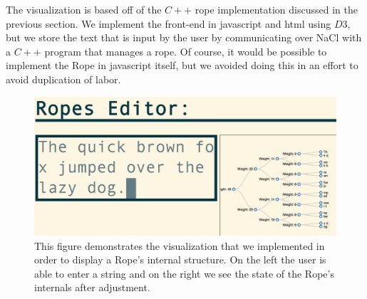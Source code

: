 \documentclass[12pt]{article}
\begin{document}
The visualization is based off of the $C++$ rope implementation discussed in the previous section. We implement the front-end in javascript and html using $D3$, but we store the text that is input by the user by communicating over NaCl with a $C++$ program that manages a rope. Of course, it would be possible to implement the Rope in javascript itself, but we avoided doing this in an effort to avoid duplication of labor.

\begin{figure}[t]
\begin{centering}
\includegraphics[scale=0.35]{editorImage1}
\caption{This figure demonstrates the visualization that we implemented in order to display a Rope's internal structure. On the left the user is able to enter a string and on the right we see the state of the Rope's internals after adjustment.}\label{editor}

\end{centering}
\end{figure}

\end{document}
